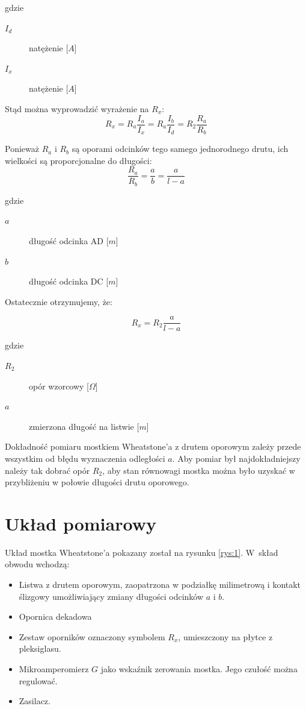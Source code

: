 \documentclass[a4paper,11pt]{article}
\begin{document}
gdzie 
\begin{description}
\item[$I_{d}$] natężenie [$A$]
\item[$I_{x}$] natężenie [$A$]

\end{description}
\indent Stąd można wyprowadzić wyrażenie na $R_x$:
\begin{equation}
\label{wzor:3}
R_x=R_a\frac{I_a}{I_x}=R_a\frac{I_b}{I_d}=R_2\frac{R_a}{R_b}
\end{equation}

Ponieważ $R_a$ i $R_b$ są oporami odcinków tego samego jednorodnego drutu, ich wielkości są proporcjonalne do długości:
\begin{equation}
\label{wzor:4}
\frac{R_a}{R_b}=\dfrac{a}{b}=\dfrac{a}{l-a}
\end{equation}

gdzie 
\begin{description}
\item[$a$] długość odcinka AD [$m$]
\item[$b$] długość odcinka DC [$m$]
\end{description}
Ostatecznie otrzymujemy, że:

\begin{equation}
\label{wzor:5}
R_x=R_2\dfrac{a}{l-a}
\end{equation}

gdzie 
\begin{description}
\item[$R_{2}$] opór wzorcowy [$\Omega$]
\item [$a$] zmierzona długość na listwie [$m$]
\end{description}
\indent Dokładność pomiaru mostkiem Wheatstone’a z drutem oporowym zależy przede wszystkim od błędu wyznaczenia odległości $a$. Aby pomiar był najdokładniejszy należy tak dobrać opór $R_2$, aby stan równowagi mostka można było uzyskać w przybliżeniu w połowie długości drutu oporowego.

\section{Układ pomiarowy}
Układ mostka Wheatstone’a pokazany został na rysunku {\ref{rys:1}}. W~skład obwodu wchodzą:
\begin{itemize}
\item Listwa z drutem oporowym, zaopatrzona w podziałkę milimetrową i kontakt ślizgowy umożliwiający zmiany długości odcinków $a$ i $b$.
\item  Opornica dekadowa
\item  Zestaw oporników oznaczony symbolem $R_x$, umieszczony na płytce z pleksiglasu.
\item Mikroamperomierz $G$ jako wskaźnik zerowania mostka. Jego czułość można regulować.
\item Zasilacz.
\end{itemize}
\end{document}
